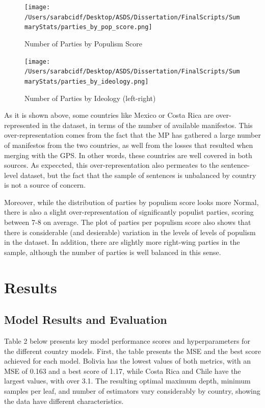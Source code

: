 \documentclass[12pt,letterpaper]{article}
\begin{document}
\begin{figure}[H]
	\centering
	\caption{Number of Parties by Populism Score}
	\label{fig:yourfigure}
	\texttt{[image: /Users/sarabcidf/Desktop/ASDS/Dissertation/FinalScripts/SummaryStats/parties\_by\_pop\_score.png]} 
\end{figure}

\begin{figure}[H]
	\centering
	\caption{Number of Parties by Ideology (left-right)}
	\label{fig:yourfigure}
	\texttt{[image: /Users/sarabcidf/Desktop/ASDS/Dissertation/FinalScripts/SummaryStats/parties\_by\_ideology.png]} 
\end{figure}

\noindent As it is shown above, some countries like Mexico or Costa Rica are over-represented in the dataset, in terms of the number of available manifestos. This over-representation comes from the fact that the MP has gathered a large number of manifestos from the two countries, as well from the losses that resulted when merging with the GPS. In other words, these countries are well covered in both sources. As expeccted, this over-representation also permeates to the sentence-level dataset, but the fact that the sample of sentences is unbalanced by country is not a source of concern. 

Moreover, while the distribution of parties by populism score looks more Normal, there is also a slight over-representation of significantly populist parties, scoring between 7-8 on average. The plot of parties per populism score also shows that there is considerable (and desierable) variation in the levels of levels of populism in the dataset. In addition, there are slightly more right-wing parties in the sample, although the number of parties is well balanced in this sense. 

\section{Results}

\vspace{.25cm}
\subsection{Model Results and Evaluation}

\vspace{.25cm}
\noindent Table 2 below presents key model performance scores and hyperparameters for the different country models. First, the table presents the MSE and the best score achieved for each model. Bolivia has the lowest values of both metrics, with an MSE of 0.163 and a best score of 1.17, while Costa Rica and Chile have the largest values, with over 3.1. The resulting optimal maximum depth, minimum samples per leaf, and number of estimators vary considerably by country, showing the data have different characteristics. 
\end{document}
